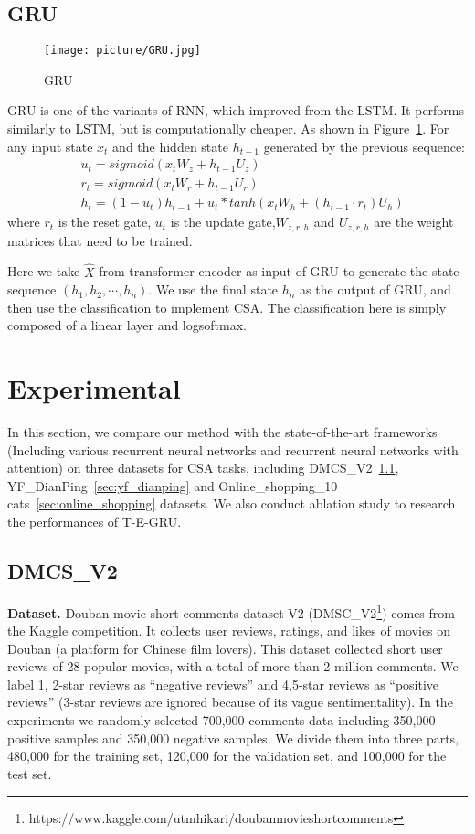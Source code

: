 \subsection{GRU}
\begin{figure}
	\centering
	\texttt{[image: picture/GRU.jpg]}
	\caption{GRU}
	\label{fig:GRU}       %
\end{figure}
GRU is one of the variants of RNN, which improved from the LSTM. It performs similarly to LSTM, but is computationally cheaper. As shown in Figure~\ref{fig:GRU}. For any input state $x_t$ and the hidden state $h_{t-1}$  generated by the previous sequence:
\begin{equation}
	\begin{split}
		&u_t = sigmoid(x_tW_z+h_{t-1}U_z) \\
		&r_t = sigmoid(x_tW_r+h_{t-1}U_r) \\
		&h_t = (1-u_t)h_{t-1} + u_t*tanh(x_tW_h+(h_{t-1} \cdot r_t)U_h)
	\end{split}
\end{equation}
where $r_t$ is the reset gate, $u_t$ is the update gate,$W_{z,r,h}$  and $U_{z,r,h}$ are the weight matrices that need to be trained. 

Here we take $\hat{X}$ from transformer-encoder as input of GRU to generate the state sequence $(h_1,h_2,\cdots,h_n)$. We use the final state $h_n$ as the output of GRU, and then use the classification to implement CSA. The classification here is simply composed of a linear layer and logsoftmax.


\section{Experimental}
In this section, we compare our method with the state-of-the-art frameworks (Including various recurrent neural networks and recurrent neural networks with attention) on three datasets for CSA tasks, including DMCS\_V2~\ref{sec:dmcs}, YF\_DianPing~\ref{sec:yf_dianping} and Online\_shopping\_10 cats~\ref{sec:online_shopping} datasets. We also conduct ablation study to research the performances of T-E-GRU.

\subsection{DMCS\_V2}
\label{sec:dmcs}
\textbf{Dataset.} Douban movie short comments dataset V2 (DMSC\_V2\footnote{https://www.kaggle.com/utmhikari/doubanmovieshortcomments}) comes from the Kaggle competition. It collects user reviews, ratings, and likes of movies on Douban (a platform for Chinese film lovers). 
This dataset collected short user reviews of 28 popular movies, with a total of more than 2 million comments.
We label 1, 2-star reviews as “negative reviews” and 4,5-star reviews as “positive reviews” (3-star reviews are ignored because of its vague sentimentality). In the experiments we randomly selected 700,000 comments data including 350,000 positive samples and 350,000 negative samples. We divide them into three parts, 480,000 for the training set, 120,000 for the validation set, and 100,000 for the test set.

